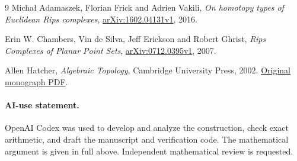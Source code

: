 \documentclass[11pt]{article}
\begin{document}
\begin{thebibliography}{9}
Micha\l{} Adamaszek, Florian Frick and Adrien Vakili,
\emph{On homotopy types of Euclidean Rips complexes},
\href{https://arxiv.org/abs/1602.04131v1}{arXiv:1602.04131v1}, 2016.

Erin W. Chambers, Vin de Silva, Jeff Erickson and Robert Ghrist,
\emph{Rips Complexes of Planar Point Sets},
\href{https://arxiv.org/abs/0712.0395v1}{arXiv:0712.0395v1}, 2007.

Allen Hatcher, \emph{Algebraic Topology}, Cambridge University Press, 2002.
\href{https://math.uchicago.edu/~farb/algtop2023/Hatcher.pdf}{Original monograph PDF}.
\end{thebibliography}

\paragraph{AI-use statement.}
OpenAI Codex was used to develop and analyze the construction, check exact
arithmetic, and draft the manuscript and verification code. The mathematical
argument is given in full above. Independent mathematical review is requested.
\end{document}
